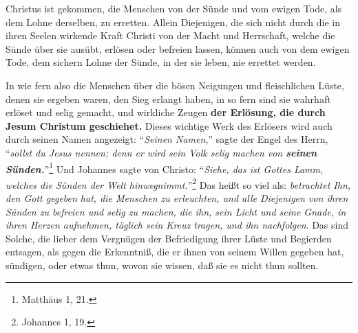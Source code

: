 Christus ist gekommen, die Menschen von der Sünde und vom ewigen Tode, als dem Lohne derselben, zu erretten.
Allein Diejenigen, die sich nicht durch die in ihren Seelen wirkende Kraft Christi von der Macht und Herrschaft, welche die Sünde über sie ausübt, erlösen oder befreien lassen, können auch von dem ewigen Tode, dem sichern Lohne der Sünde, in der sie leben, nie errettet werden.

\medskip 

In wie fern also die Menschen über die bösen Neigungen und fleischlichen Lüste, denen sie ergeben waren, den Sieg erlangt haben, in so fern sind sie wahrhaft erlöset und selig gemacht, und wirkliche Zeugen \textbf{der Erlösung, die durch Jesum Christum geschiehet.}
Dieses wichtige Werk des Erlösers wird auch durch seinen Namen angezeigt: "`\textit{Seinen Namen,}"' sagte der Engel des Herrn, "`\textit{sollst du Jesus nennen; denn er wird sein Volk selig machen von \textbf{seinen Sünden.}}"'\footnote{Matthäus 1, 21.} 
Und Johannes sagte von Christo: "`\textit{Siehe, das ist Gottes Lamm, welches die Sünden der Welt hinwegnimmt.}"'\footnote{Johannes 1, 19.} 
Das heißt so viel als:
\textit{betrachtet Ihn, den Gott gegeben hat, die Menschen zu erleuchten, und alle Diejenigen von ihren Sünden zu befreien und selig zu machen, die ihn, sein Licht und seine Gnade, in ihren Herzen aufnehmen, täglich sein Kreuz tragen, und ihn nachfolgen}.
Das sind Solche, die lieber dem Vergnügen der Befriedigung ihrer Lüste und Begierden entsagen, als gegen die Erkenntniß, die er ihnen von seinem Willen gegeben hat, sündigen, oder etwas thun, wovon sie wissen, daß sie es nicht thun sollten.




